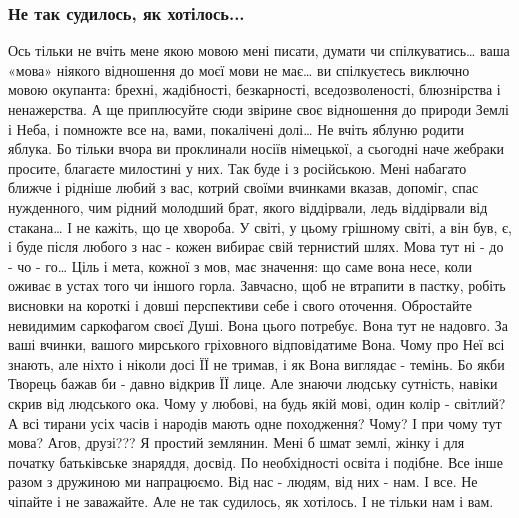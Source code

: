  
 
 
\subsubsection{Не так судилось, як хотілось...}


Ось тільки не вчіть мене якою мовою мені писати, думати чи спілкуватись… ваша
«мова» ніякого відношення до моєї мови не має… ви спілкуєтесь виключно мовою
окупанта: брехні, жадібності, безкарності, вседозволеності, блюзнірства і
ненажерства. А ще приплюсуйте сюди звірине своє відношення до природи Землі і
Неба, і помножте все на, вами, покалічені долі… Не вчіть яблуню родити яблука.
Бо тільки вчора ви проклинали носіїв німецької, а сьогодні наче жебраки
просите, благаєте милостині у них. Так буде і з російською. Мені набагато
ближче і рідніше любий з вас, котрий своїми вчинками вказав, допоміг, спас
нужденного, чим рідний молодший брат, якого віддірвали, ледь віддірвали від
стакана… І не кажіть, що це хвороба. У світі, у цьому грішному світі, а він
був, є, і буде після любого з нас - кожен вибирає свій тернистий шлях. Мова тут
ні - до - чо - го… Ціль і мета, кожної з мов, має значення: що саме вона несе,
коли оживає в устах того чи іншого горла. Завчасно, щоб не втрапити в пастку,
робіть висновки на короткі і довші перспективи себе і свого оточення.
Обростайте невидимим саркофагом своєї Душі. Вона цього потребує. Вона тут не
надовго. За ваші вчинки, вашого мирського гріховного відповідатиме Вона. Чому
про Неї всі знають, але ніхто і ніколи досі ЇЇ не тримав, і як Вона виглядає -
темінь. Бо якби Творець бажав би - давно відкрив ЇЇ лице. Але знаючи людську
сутність, навіки скрив від людського ока. Чому у любові, на будь якій мові,
один колір - світлий? А всі тирани усіх часів і народів мають одне походження?
Чому? І при чому тут мова? Агов, друзі??? Я простий землянин. Мені б шмат
землі, жінку і для початку батьківське знаряддя, досвід. По необхідності освіта
і подібне. Все інше разом з дружиною ми напрацюємо. Від нас - людям, від них -
нам. І все. Не чіпайте і не заважайте. Але не так судилось, як хотілось. І не
тільки нам і вам. 
